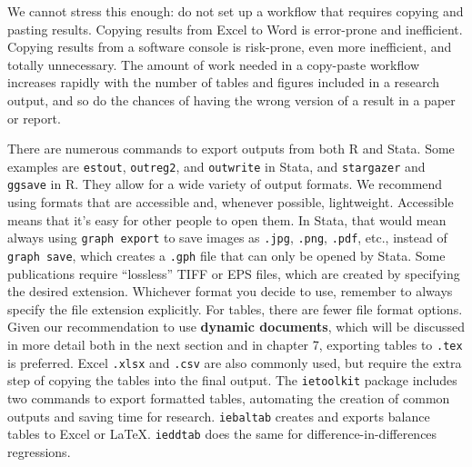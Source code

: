 We cannot stress this enough:
do not set up a workflow that requires copying and pasting results.
Copying results from Excel to Word is error-prone and inefficient.
Copying results from a software console is risk-prone,
even more inefficient, and totally unnecessary.
The amount of work needed in a copy-paste workflow increases
rapidly with the number of tables and figures included in a research output,
and so do the chances of having the wrong version of a result in a paper or report.

There are numerous commands to export outputs from both R and Stata.
Some examples are \texttt{estout},\cite{estout05, estout07}
\texttt{outreg2},
and \texttt{outwrite} in Stata,
and \texttt{stargazer}
and \texttt{ggsave} in R.
They allow for a wide variety of output formats. We recommend using formats that are accessible and, whenever possible, lightweight.
Accessible means that it's easy for other people to open them.
In Stata, that would mean always using \texttt{graph export} to save images as
\texttt{.jpg}, \texttt{.png}, \texttt{.pdf}, etc.,
instead of \texttt{graph save},
which creates a \texttt{.gph} file that can only be opened by Stata.
Some publications require ``lossless'' TIFF or EPS files,
which are created by specifying the desired extension.
Whichever format you decide to use,
remember to always specify the file extension explicitly.
For tables, there are fewer file format options.
Given our recommendation to use \textbf{dynamic documents},
which will be discussed in more detail both in the next section and in chapter 7,
exporting tables to \texttt{.tex} is preferred.
Excel \texttt{.xlsx} and \texttt{.csv} are also commonly used,
but require the extra step of copying the tables into the final output.
The \texttt{ietoolkit} package includes two commands to export formatted tables,
automating the creation of common outputs and saving time for research.
\texttt{iebaltab}
creates and exports balance tables to Excel or {\LaTeX}.
\texttt{ieddtab}
does the same for difference-in-differences regressions.

